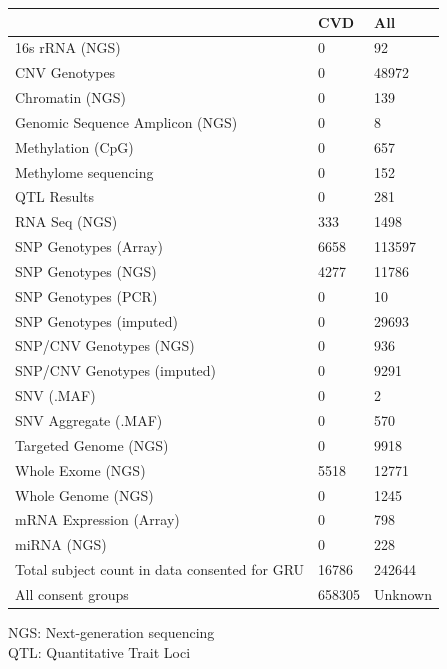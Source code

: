 \documentclass[letter]{bioinfo}
\begin{document}
	
			\begin{table}[]
{\begin{tabular}{l l l}
			\toprule
			& \textbf{CVD} &  \textbf{All}                         \\ \midrule
			16s rRNA (NGS)                 &     0 &      92 \\
			CNV Genotypes                  &     0 &   48972 \\
			Chromatin (NGS)                &     0 &     139 \\
			Genomic Sequence Amplicon (NGS)&     0 &       8 \\
			Methylation (CpG)              &     0 &     657 \\
			Methylome sequencing           &     0 &     152 \\
			QTL Results                    &     0 &     281 \\
			RNA Seq (NGS)                  &   333 &    1498 \\
			SNP Genotypes (Array)          &  6658 &  113597 \\
			SNP Genotypes (NGS)            &  4277 &   11786 \\
			SNP Genotypes (PCR)            &     0 &      10 \\
			SNP Genotypes (imputed)        &     0 &   29693 \\
			SNP/CNV Genotypes (NGS)        &     0 &     936 \\
			SNP/CNV Genotypes (imputed)    &     0 &    9291 \\
			SNV (.MAF)                     &     0 &       2 \\
			SNV Aggregate (.MAF)           &     0 &     570 \\
			Targeted Genome (NGS)          &     0 &    9918 \\
			Whole Exome (NGS)              &  5518 &   12771 \\
			Whole Genome (NGS)             &     0 &    1245 \\
			mRNA Expression (Array)        &     0 &     798 \\
			miRNA (NGS)                        & 0 &   228 \\ \hline
			Total subject count in data consented for GRU & 16786 & 242644 \\ \hline
			All consent groups & 658305 & Unknown \\	
		\end{tabular}}{NGS: Next-generation sequencing\\ QTL: Quantitative Trait Loci}
	\end{table}
	
\end{document}
